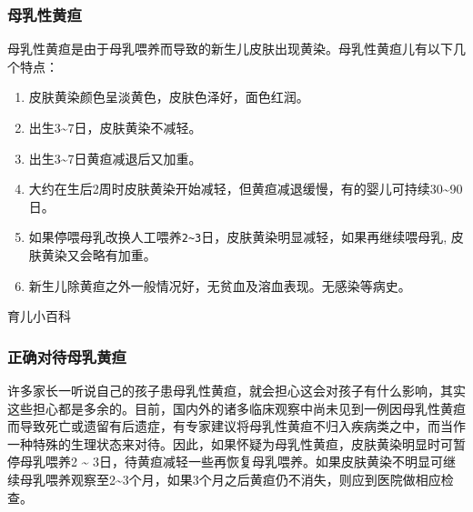 \subsubsection{母乳性黄疸}%

母乳性黄疸是由于母乳喂养而导致的新生儿皮肤出现黄染。母乳性黄疸儿有以下几个特点：

\begin{enumerate}
\item
  皮肤黄染颜色呈淡黄色，皮肤色泽好，面色红润。
\item
  出生3\textasciitilde7日，皮肤黄染不减轻。
\item
  出生3\textasciitilde7日黄疸减退后又加重。
\item
  大约在生后2周时皮肤黄染开始减轻，但黄疸减退缓慢，有的婴儿可持续30\textasciitilde90日。
\item
  如果停喂母乳改换人工喂养\texttt{2\textasciitilde{}3}\hspace{0pt}日，皮肤黄染明显减轻，如果再继续喂母乳,
  皮肤黄染又会略有加重。
\item
  新生儿除黄疸之外一般情况好，无贫血及溶血表现。无感染等病史。
\end{enumerate}

\begin{mybox}[colback=yellow]{育儿小百科}
\subsubsection*{正确对待母乳黄疸}
许多家长一听说自己的孩子患母乳性黄疸，就会担心这会对孩子有什么影响，其实这些担心都是多余的。目前，国内外的诸多临床观察中尚未见到一例因母乳性黄疸而导致死亡或遗留有后遗症，有专家建议将母乳性黄疸不归入疾病类之中，而当作一种特殊的生理状态来对待。因此，如果怀疑为母乳性黄疸，皮肤黄染明显时可暂停母乳喂养2
\textasciitilde{}
3日，待黄疸减轻一些再恢复母乳喂养。如果皮肤黄染不明显可继续母乳喂养观察至2\textasciitilde3个月，如果3个月之后黄疸仍不消失，则应到医院做相应检查。
\end{mybox}






